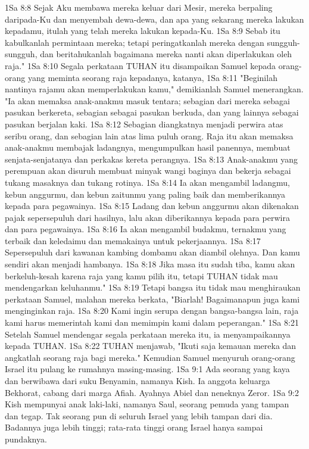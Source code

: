 1Sa 8:8  Sejak Aku membawa mereka keluar dari Mesir, mereka berpaling daripada-Ku dan menyembah dewa-dewa, dan apa yang sekarang mereka lakukan kepadamu, itulah yang telah mereka lakukan kepada-Ku.
1Sa 8:9  Sebab itu kabulkanlah permintaan mereka; tetapi peringatkanlah mereka dengan sungguh-sungguh, dan beritahukanlah bagaimana mereka nanti akan diperlakukan oleh raja."
1Sa 8:10  Segala perkataan TUHAN itu disampaikan Samuel kepada orang-orang yang meminta seorang raja kepadanya, katanya,
1Sa 8:11  "Beginilah nantinya rajamu akan memperlakukan kamu," demikianlah Samuel menerangkan. "Ia akan memaksa anak-anakmu masuk tentara; sebagian dari mereka sebagai pasukan berkereta, sebagian sebagai pasukan berkuda, dan yang lainnya sebagai pasukan berjalan kaki.
1Sa 8:12  Sebagian diangkatnya menjadi perwira atas seribu orang, dan sebagian lain atas lima puluh orang. Raja itu akan memaksa anak-anakmu membajak ladangnya, mengumpulkan hasil panennya, membuat senjata-senjatanya dan perkakas kereta perangnya.
1Sa 8:13  Anak-anakmu yang perempuan akan disuruh membuat minyak wangi baginya dan bekerja sebagai tukang masaknya dan tukang rotinya.
1Sa 8:14  Ia akan mengambil ladangmu, kebun anggurmu, dan kebun zaitunmu yang paling baik dan memberikannya kepada para pegawainya.
1Sa 8:15  Ladang dan kebun anggurmu akan dikenakan pajak sepersepuluh dari hasilnya, lalu akan diberikannya kepada para perwira dan para pegawainya.
1Sa 8:16  Ia akan mengambil budakmu, ternakmu yang terbaik dan keledaimu dan memakainya untuk pekerjaannya.
1Sa 8:17  Sepersepuluh dari kawanan kambing dombamu akan diambil olehnya. Dan kamu sendiri akan menjadi hambanya.
1Sa 8:18  Jika masa itu sudah tiba, kamu akan berkeluh-kesah karena raja yang kamu pilih itu, tetapi TUHAN tidak mau mendengarkan keluhanmu."
1Sa 8:19  Tetapi bangsa itu tidak mau menghiraukan perkataan Samuel, malahan mereka berkata, "Biarlah! Bagaimanapun juga kami menginginkan raja.
1Sa 8:20  Kami ingin serupa dengan bangsa-bangsa lain, raja kami harus memerintah kami dan memimpin kami dalam peperangan."
1Sa 8:21  Setelah Samuel mendengar segala perkataan mereka itu, ia menyampaikannya kepada TUHAN.
1Sa 8:22  TUHAN menjawab, "Ikuti saja kemauan mereka dan angkatlah seorang raja bagi mereka." Kemudian Samuel menyuruh orang-orang Israel itu pulang ke rumahnya masing-masing.
1Sa 9:1  Ada seorang yang kaya dan berwibawa dari suku Benyamin, namanya Kish. Ia anggota keluarga Bekhorat, cabang dari marga Afiah. Ayahnya Abiel dan neneknya Zeror.
1Sa 9:2  Kish mempunyai anak laki-laki, namanya Saul, seorang pemuda yang tampan dan tegap. Tak seorang pun di seluruh Israel yang lebih tampan dari dia. Badannya juga lebih tinggi; rata-rata tinggi orang Israel hanya sampai pundaknya.
